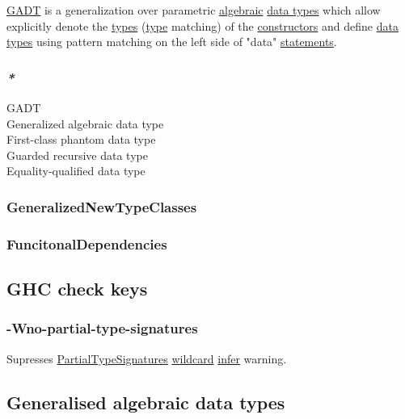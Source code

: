 \documentclass[11pt]{article}
\begin{document}
\hyperref[orgaf2367e]{GADT} is a generalization over parametric \hyperref[orgf3466c3]{algebraic} \hyperref[org88981ee]{data types} which allow explicitly denote the \hyperref[org3927fd9]{types} (\hyperref[org4fbaeb8]{type} matching) of the \hyperref[orgc5bd814]{constructors} and define \hyperref[org88981ee]{data types} using pattern matching on the left side of "data" \hyperref[org3a604a1]{statements}.\\

\subsubsection{\emph{*}}
\label{sec:org0581439}

\label{orgaf2367e}GADT\\
\label{org73ae67f}Generalized algebraic data type\\
\label{org36d3ef4}First-class phantom data type\\
\label{org80d9567}Guarded recursive data type\\
\label{org99c1583}Equality-qualified data type\\

\subsubsection{\label{org8c2a1ab}GeneralizedNewTypeClasses}
\label{sec:org6e8dc75}

\subsubsection{\label{orgb89570d}FuncitonalDependencies}
\label{sec:org1fc71db}

\subsection{\label{org80c6889}GHC check keys}
\label{sec:org9b302d8}

\subsubsection{\label{orgfb5f538}-Wno-partial-type-signatures}
\label{sec:orgbb5a50b}

Supresses \hyperref[orgdcbb3d1]{PartialTypeSignatures} \hyperref[orgc7ff37d]{wildcard} \hyperref[org774bd97]{infer} warning.\\

\subsection{\label{org5df7989}Generalised algebraic data types}
\label{sec:org6cdb090}
\end{document}
